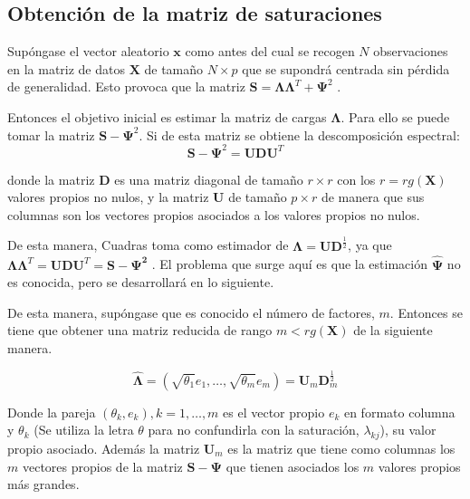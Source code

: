 \subsection{Obtención de la matriz de saturaciones}
\noindent Supóngase el vector aleatorio $\mathbf{x}$ como antes del cual se recogen $N$ observaciones en la matriz de datos $\mathbf{X}$ de tamaño $N\times p$ que se supondrá centrada sin pérdida de generalidad. Esto provoca que la matriz $\mathbf{S}=\mathbf{\Lambda}\mathbf{\Lambda}^T+\mathbf{\Psi}^2$ \cite{Peña 2002}. 

\noindent Entonces el objetivo inicial es estimar la matriz de cargas $\mathbf{\Lambda}$. Para ello se puede tomar la matriz $\mathbf{S}-\mathbf{\Psi}^2$. Si de esta matriz se obtiene la descomposición espectral:
\begin{equation}
\mathbf{S}-\mathbf{\Psi}^2=\mathbf{U}\mathbf{D}\mathbf{U}^T
\end{equation}

\noindent donde la matriz $\mathbf{D}$ es una matriz diagonal de tamaño $r\times r$ con los $r=rg(\mathbf{X})$ valores propios no nulos, y la matriz $\mathbf{U}$ de tamaño $p\times r$ de manera que sus columnas son los vectores propios asociados a los valores propios no nulos. 

\noindent De esta manera, Cuadras  toma como estimador de $\mathbf{\Lambda}=\mathbf{UD}^{\frac{1}{2}}$, ya que \\ $\mathbf{\Lambda}\mathbf{\Lambda}^T=\mathbf{U}\mathbf{D}\mathbf{U}^T= \mathbf{S-\Psi^2}$ \cite{Cuadras 2014}. El problema que surge aquí es que la estimación $\mathbf{\hat{\Psi}}$ no es conocida, pero se desarrollará en lo siguiente. 

\noindent De esta manera, supóngase que es conocido el número de factores, $m$. Entonces se tiene que obtener una matriz reducida de rango $m<rg(\mathbf{X})$ de la siguiente manera. 

\begin{equation}
\mathbf{\hat{\Lambda}}=(\sqrt{\theta_1}e_1,\ldots,\sqrt{\theta_m}e_m)=\mathbf{U}_m\mathbf{D}_m^{\frac{1}{2}}
\end{equation}

\noindent Donde la pareja $(\theta_k, e_k), k=1, \ldots, m$ es el vector propio $e_k$ en formato columna y $\theta_k$ (Se utiliza la letra $\theta$ para no confundirla con la saturación, $\lambda_{kj}$), su valor propio asociado. Además la matriz $\mathbf{U}_m$ es la matriz que tiene como columnas los $m$ vectores propios de la matriz $\mathbf{S}-\mathbf{\Psi}$ que tienen asociados los $m$ valores propios más grandes. 

